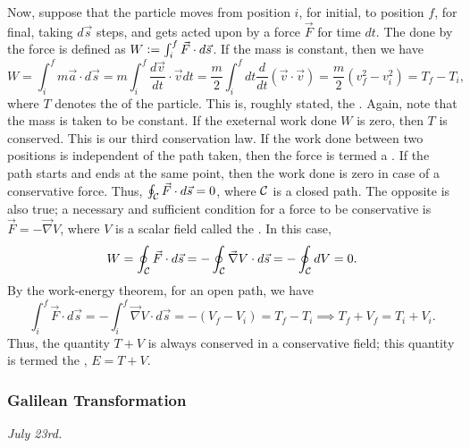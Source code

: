 Now, suppose that the particle moves from position $i$, for initial, to position $f$, for final, taking $d\vec{s}$ steps, and gets acted upon by a force $\vec{F}$ for time $dt$. The  done by the force is defined as $W \vcentcolon= \int_{i}^{f} \vec{F} \cdot d\vec{s}$. If the mass is constant, then we have
\begin{equation}
    W = \int_{i}^{f} m \vec{a} \cdot d\vec{s} = m \int_{i}^{f} \frac{d\vec{v}}{dt} \cdot \vec{v} dt = \frac{m}{2} \int_{i}^{f} dt \frac{d}{dt}(\vec{v} \cdot \vec{v}) = \frac{m}{2} \left( v_{f}^{2} - v_{i}^{2} \right) = T_{f} - T_{i},
\end{equation}
where $T$ denotes the  of the particle. This is, roughly stated, the . Again, note that the mass is taken to be constant. If the exeternal work done $W$ is zero, then $T$ is conserved. This is our third conservation law. If the work done between two positions is independent of the path taken, then the force is termed a . If the path starts and ends at the same point, then the work done is zero in case of a conservative force. Thus, $\oint_{\mathcal{C}}\vec{F} \cdot d\vec{s} = 0$, where $\mathcal{C}$ is a closed path. The opposite is also true; a necessary and sufficient condition for a force to be conservative is $\vec{F} = -\vec{\nabla} V$, where $V$ is a scalar field called the . In this case,
\begin{equation}
    W = \oint_{\mathcal{C}} \vec{F} \cdot d\vec{s} = -\oint_{\mathcal{C}} \vec{\nabla} V \cdot d\vec{s} = -\oint_{\mathcal{C}} dV = 0.
\end{equation}
By the work-energy theorem, for an open path, we have
\begin{equation}
    \int_{i}^{f} \vec{F} \cdot d\vec{s} = -\int_{i}^{f} \vec{\nabla} V \cdot d\vec{s} = -(V_{f}-V_{i}) = T_{f} - T_{i} \implies T_{f} + V_{f} = T_{i} + V_{i}.
\end{equation}
Thus, the quantity $T+V$ is always conserved in a conservative field; this quantity is termed the , $E = T+V$.
\subsubsection{Galilean Transformation}
\textit{July 23rd.}

